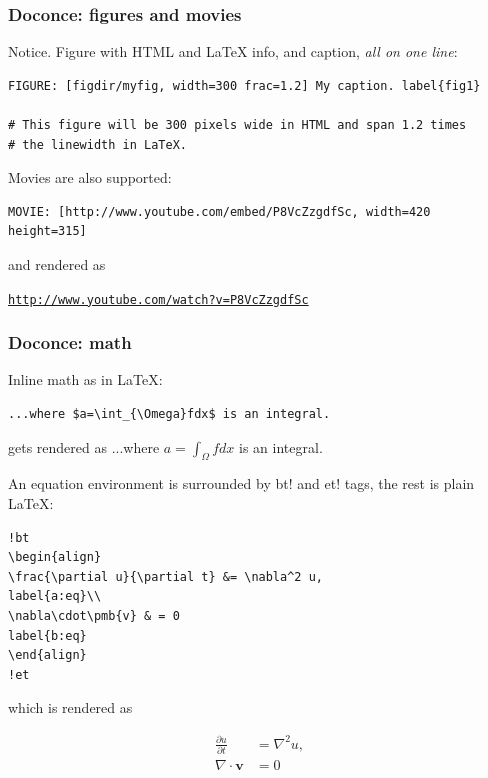 \documentclass{beamer}
\newenvironment{graybox1admon}[1][]{\begin{block}{#1}}{\end{block}}
\begin{document}
\begin{frame}
\frametitle{Doconce: figures and movies}

\begin{graybox1admon}[Notice.]
Figure with HTML and {\LaTeX} info, and caption, \emph{all on one line}:
\end{graybox1admon}

\begin{Verbatim}[numbers=none,fontsize=\fontsize{9pt}{9pt},baselinestretch=0.95]
FIGURE: [figdir/myfig, width=300 frac=1.2] My caption. label{fig1}

# This figure will be 300 pixels wide in HTML and span 1.2 times
# the linewidth in LaTeX.
\end{Verbatim}

Movies are also supported:

\begin{Verbatim}[numbers=none,fontsize=\fontsize{9pt}{9pt},baselinestretch=0.95]
MOVIE: [http://www.youtube.com/embed/P8VcZzgdfSc, width=420 height=315]
\end{Verbatim}
and rendered as

 \href{{http://www.youtube.com/watch?v=P8VcZzgdfSc}}{\nolinkurl{http://www.youtube.com/watch?v=P8VcZzgdfSc}}
\end{frame}

\begin{frame}
\frametitle{Doconce: math}

Inline math as in {\LaTeX}:

\begin{Verbatim}[numbers=none,fontsize=\fontsize{9pt}{9pt},baselinestretch=0.95]
...where $a=\int_{\Omega}fdx$ is an integral.
\end{Verbatim}
gets rendered as ...where $a=\int_{\Omega}fdx$ is an integral.


An equation environment is surrounded by \Verb!!bt! and \Verb!!et! tags,
the rest is plain {\LaTeX}:

\begin{Verbatim}[numbers=none,fontsize=\fontsize{9pt}{9pt},baselinestretch=0.95]
!bt
\begin{align}
\frac{\partial u}{\partial t} &= \nabla^2 u,
label{a:eq}\\
\nabla\cdot\pmb{v} & = 0
label{b:eq}
\end{align}
!et
\end{Verbatim}
which is rendered as

\begin{align}
\frac{\partial u}{\partial t} &= \nabla^2 u,
\label{a:eq}\\
\nabla\cdot\pmb{v} & = 0
\label{b:eq}
\end{align}
\end{frame}
\end{document}
